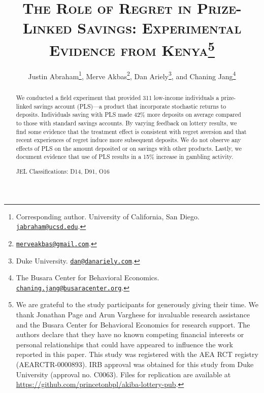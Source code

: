 \documentclass[11pt]{article}
\begin{document}
\title{\textsc{The Role of Regret in Prize-Linked Savings: Experimental Evidence from Kenya}\protect\footnote{We are grateful to the study participants for generously giving their time. We thank Jonathan Page and Arun Varghese for invaluable research assistance and the Busara Center for Behavioral Economics for research support. The authors declare that they have no known competing financial interests or personal relationships that could have appeared to influence the work reported in this paper. This study was registered with the AEA RCT registry (AEARCTR-0000893). IRB approval was obtained for this study from Duke University (approval no. C0063). Files for replication are available at \url{https://github.com/princetonbpl/akiba-lottery-pub}.}}

\author{
    Justin Abraham\thanks{Corresponding author. University of California, San Diego. \protect\href{mailto:jabraham@ucsd.edu}{\nolinkurl{jabraham@ucsd.edu}}.},
    Merve Akbas\thanks{\protect\href{mailto:merveakbas@gmail.com}{\nolinkurl{merveakbas@gmail.com}}.},
    Dan Ariely\thanks{Duke University. \protect\href{mailto:dan@danariely.com}{\nolinkurl{dan@danariely.com}}.}, and
    Chaning Jang\thanks{The Busara Center for Behavioral Economics. \protect\href{mailto:chaning.jang@busaracenter.org}{\nolinkurl{chaning.jang@busaracenter.org}}.}
}

\maketitle

	\begin{abstract}

		We conducted a field experiment that provided 311 low-income individuals a prize-linked savings account (PLS)---a product that incorporate stochastic returns to deposits. Individuals saving with PLS made 42\% more deposits on average compared to those with standard savings accounts. By varying feedback on lottery results, we find some evidence that the treatment effect is consistent with regret aversion and that recent experiences of regret induce more subsequent deposits. We do not observe any effects of PLS on the amount deposited or on savings with other products. Lastly, we document evidence that use of PLS results in a 15\% increase in gambling activity.

		\medskip \noindent
		JEL Classifications: D14, D91, O16

 	\end{abstract}
\end{document}
